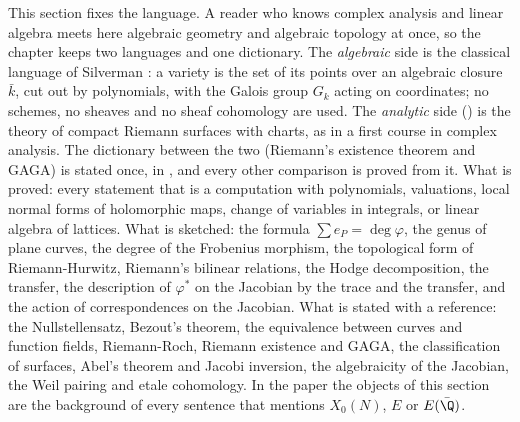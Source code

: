 This section fixes the language. A reader who knows complex analysis and linear algebra meets here algebraic geometry and
algebraic topology at once, so the chapter keeps two languages and one dictionary. The \emph{algebraic} side is the classical
language of Silverman \cite[Chapters I and II]{SilvermanAEC}: a variety is the set of its points over an algebraic closure
$\bar k$, cut out by polynomials, with the Galois group $G_k$ acting on coordinates; no schemes, no sheaves and no sheaf
cohomology are used. The \emph{analytic} side ()
is the theory of compact Riemann surfaces with charts, as in a first course in complex analysis. The dictionary between
the two (Riemann's existence theorem and GAGA) is stated once, in , and every other
comparison is proved from it. What is proved: every statement that is a computation with polynomials, valuations, local
normal forms of holomorphic maps, change of variables in integrals, or linear algebra of lattices. What is sketched: the
formula $\sum e_P=\deg\varphi$, the genus of plane curves, the degree of the Frobenius morphism, the topological form of Riemann-Hurwitz, Riemann's bilinear
relations, the Hodge decomposition, the transfer, the description of $\varphi^*$ on the Jacobian by the trace and the transfer, and the action of correspondences
on the Jacobian.
What is stated with a reference: the Nullstellensatz, Bezout's theorem, the equivalence between curves and function fields,
Riemann-Roch, Riemann existence and GAGA, the classification of surfaces, Abel's theorem and Jacobi inversion, the
algebraicity of the Jacobian, the Weil pairing and etale cohomology. In the paper the objects of this section are the
background of every sentence that mentions $X_0(N)$, $E$ or $E(\bar\Q)$.


